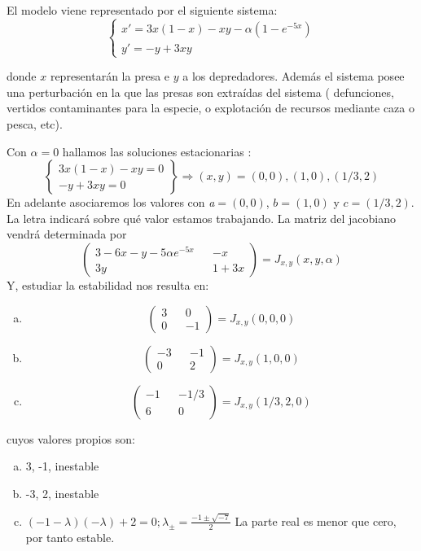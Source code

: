  El modelo viene representado por el siguiente sistema:
\begin{equation}
\left \{ \begin{matrix} x'=3x(1-x)-xy-\alpha(1-e^{-5x})\\ y'=-y+3xy \end{matrix}\right .
\label{pp2}
\end{equation}


donde $x$ representarán la presa e $y$ a los depredadores. Además el sistema posee una perturbación en la que las presas son extraídas del sistema ( defunciones, vertidos contaminantes para la especie, o explotación de recursos mediante caza o pesca, etc).

Con $ \alpha=0$ hallamos las soluciones estacionarias :
\[ \left \{ \begin{matrix} 3x(1-x)-xy=0\\ -y+3xy=0  \end{matrix}  \right \} \Rightarrow (x,y)=(0,0),(1,0),(1/3,2) \]
En adelante asociaremos los valores con \emph{a}$=(0,0)$, $b=(1,0)$ y $c=(1/3,2)$. La letra indicará sobre qué valor estamos trabajando.  
La matriz del jacobiano vendrá determinada por
 \[ \left (\begin{matrix} 3-6x-y-5\alpha e^{-5x} && -x \\ 3y && 1+3x  \end{matrix}  \right )=J_{x,y}(x,y,\alpha)\]
 Y, estudiar la estabilidad nos resulta en:
 \begin{enumerate}[a)]
 	\item  \[ \left (\begin{matrix} 3 && 0 \\ 0 && -1  \end{matrix}  \right )=J_{x,y}(0,0,0)\]
 	\item  \[ \left (\begin{matrix} -3 && -1 \\ 0 && 2  \end{matrix}  \right )=J_{x,y}(1,0,0)\]
 	\item  \[ \left (\begin{matrix} -1 && -1/3 \\ 6 && 0  \end{matrix}  \right )=J_{x,y}(1/3,2,0)\]
 \end{enumerate}
cuyos valores propios son:
\begin{enumerate}[a)]
	\item 3, -1, inestable
	\item -3, 2, inestable
	\item $(-1-\lambda)(-\lambda)+2=0;
	\lambda_\pm = \frac{-1\pm \sqrt{-7}}{2}$ La parte real es menor que cero, por tanto estable.
\end{enumerate}

